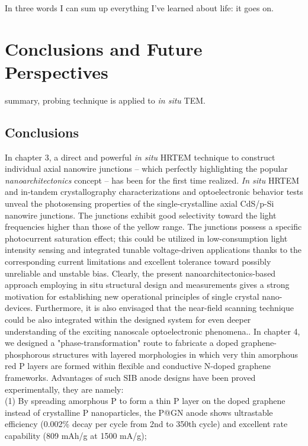 
\begin{savequote}[75mm] 
In three words I can sum up everything I've learned about life: it goes on.
\end{savequote}

\chapter{Conclusions and Future Perspectives}

 summary, probing technique is applied to \emph{in situ} TEM.

\section{Conclusions}
In chapter 3, a direct and powerful {\em in situ} HRTEM technique to construct individual axial nanowire junctions -- which perfectly highlighting the popular {\em nanoarchitectonics} concept -- has been for the first time realized. {\em In situ} HRTEM and in-tandem crystallography characterizations and optoelectronic behavior tests unveal the photosensing properties of the single-crystalline axial CdS/p-Si nanowire junctions. The junctions exhibit good selectivity toward the light frequencies higher than those of the yellow range. The junctions possess a specific photocurrent saturation effect; this could be utilized in low-consumption light intensity sensing and integrated tunable voltage-driven applications thanks to the corresponding current limitations and excellent tolerance toward possibly unreliable and unstable bias. Clearly, the present nanoarchitectonics-based approach employing in situ structural design and measurements gives a strong motivation for establishing new operational principles of single crystal nano-devices. Furthermore, it is also envisaged that the near-field scanning technique could be also integrated within the designed system for even deeper understanding of the exciting nanoscale optoelectronic phenomena.\cite{Gu2005,Xiang2012}.
In chapter 4, we designed a "phase-transformation" route to fabricate a doped graphene-phosphorous structures with layered morphologies in which very thin amorphous red P layers are formed within flexible and conductive N-doped graphene frameworks. Advantages of such SIB anode designs have been proved experimentally, they are namely: \\
(1) By spreading amorphous P to form a thin P layer on the doped graphene instead of crystalline P nanoparticles, the P@GN anode shows ultrastable efficiency (0.002\% decay per cycle from 2nd to 350th cycle) and excellent rate capability (809 mAh/g at 1500 mA/g); \\
